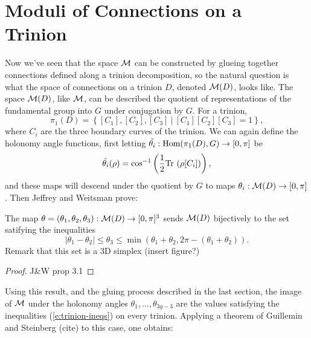 \section{Moduli of Connections on a Trinion}
 	Now we've seen that the space $\mathcal{M}$ can be constructed by glueing together connections defined along a trinion decomposition, so the natural question is what the space of connections on a trinion $D$, denoted $\mathcal{M}(D)$, looks like. The space $\mathcal{M}(D)$, like $\mathcal{M}$, can be described the quotient of representations of the fundamental group into $G$ under conjugation by $G$. For a trinion, 
	\begin{equation}
		\pi_1(D) = \left\{
		[C_1], [C_2], [C_3] ~|~ [C_1][C_2][C_3]  =1
		\right\},
	\end{equation}
	where $C_i$ are the three boundary curves of the trinion. We can again define the holonomy angle functions, first letting $\tilde{\theta_i}:\text{Hom}(\pi_1(D),G) \to [0,\pi]$ be
	\begin{equation}
		\label{e:thetacoords}
		\tilde{\theta_i}(\rho) = \cos^{-1}\left(\frac{1}{2}\text{Tr }(\rho[C_i])\right),
	\end{equation}
	and these maps will descend under the quotient by $G$ to maps $\theta_i:\mathcal{M}(D)\to [0,\pi]$. Then Jeffrey and Weitsman prove:
	\begin{theorem}
		The map $\theta = (\theta_1, \theta_2, \theta_3):\mathcal{M}(D)\to[0,\pi]^3$ sends $\mathcal{M}(D)$ bijectively to the set satifying the inequalities
		\begin{equation}
			|\theta_1 - \theta_2| \leq \theta_3 \leq \min(\theta_1 + \theta_2, 2\pi - (\theta_1 + \theta_2)).
			\label{e:trinion-ineqs}
		\end{equation}
		Remark that this set is a 3D simplex (insert figure?)
	\end{theorem}
	\begin{proof}
		J\&W prop 3.1
	\end{proof}
	Using this result, and the gluing process described in the last section, the image of $\mathcal{M}$ under the holonomy angles $\theta_1,...,\theta_{3g-3}$ are the values satisfying the inequalities (\ref{e:trinion-ineqs}) on every trinion. Applying a theorem of Guillemin and Steinberg (cite) to this case, one obtains:
